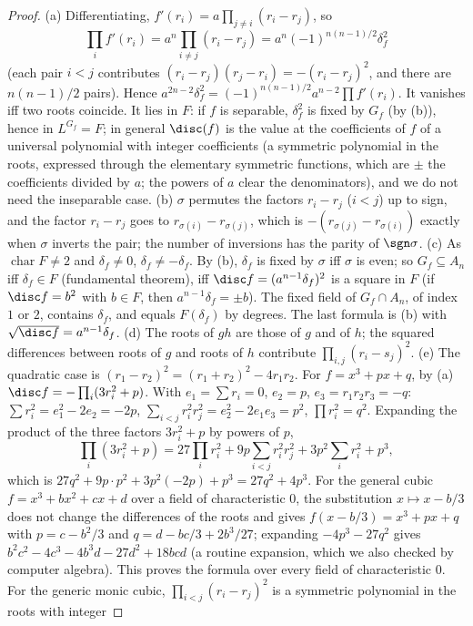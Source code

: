 \begin{proof}
(a) Differentiating, $f'(r_i)=a\prod_{j\ne i}(r_i-r_j)$, so
\[
\prod_if'(r_i)=a^n\prod_{i\ne j}(r_i-r_j)=a^n(-1)^{n(n-1)/2}\delta_f^2
\]
(each pair $i<j$ contributes $(r_i-r_j)(r_j-r_i)=-(r_i-r_j)^2$, and there are $n(n-1)/2$ pairs). Hence $a^{2n-2}\delta_f^2=(-1)^{n(n-1)/2}a^{n-2}\prod f'(r_i)$. It vanishes iff two roots coincide. It lies in $F$: if $f$ is separable, $\delta_f^2$ is fixed by
$G_f$ (by (b)), hence in $L^{G_f}=F$; in general $\disc(f)$ is the value at the coefficients of $f$ of a universal polynomial with integer coefficients (a symmetric
polynomial in the roots, expressed through the elementary symmetric functions, which are $\pm$ the coefficients divided by $a$; the powers of $a$ clear the
denominators), and we do not need the inseparable case.
(b) $\sigma$ permutes the factors $r_i-r_j$ ($i<j$) up to sign, and the factor $r_i-r_j$ goes to $r_{\sigma(i)}-r_{\sigma(j)}$, which is $-(r_{\sigma(j)}-r_{\sigma(i)})$
exactly when $\sigma$ inverts the pair; the number of inversions has the parity of $\sgn\sigma$.
(c) As $\operatorname{char}F\ne2$ and $\delta_f\ne0$, $\delta_f\ne-\delta_f$. By (b), $\delta_f$ is fixed by $\sigma$ iff $\sigma$ is even; so $G_f\subseteq A_n$ iff
$\delta_f\in F$ (fundamental theorem), iff $\disc f=(a^{n-1}\delta_f)^2$ is a square in $F$ (if $\disc f=b^2$ with $b\in F$, then $a^{n-1}\delta_f=\pm b$). The fixed field
of $G_f\cap A_n$, of index $1$ or $2$, contains $\delta_f$, and equals $F(\delta_f)$ by degrees. The last formula is (b) with $\sqrt{\disc f}=a^{n-1}\delta_f$.
(d) The roots of $gh$ are those of $g$ and of $h$; the squared differences between roots of $g$ and roots of $h$ contribute $\prod_{i,j}(r_i-s_j)^2$.
(e) The quadratic case is $(r_1-r_2)^2=(r_1+r_2)^2-4r_1r_2$. For $f=x^3+px+q$, by (a) $\disc f=-\prod_i(3r_i^2+p)$. With $e_1=\sum r_i=0$, $e_2=p$, $e_3=r_1r_2r_3=-q$:
$\sum r_i^2=e_1^2-2e_2=-2p$, $\sum_{i<j}r_i^2r_j^2=e_2^2-2e_1e_3=p^2$, $\prod r_i^2=q^2$. Expanding the product of the three factors $3r_i^2+p$ by powers of $p$,
\[
\prod_i(3r_i^2+p)=27\prod_ir_i^2+9p\sum_{i<j}r_i^2r_j^2+3p^2\sum_ir_i^2+p^3,
\]
which is $27q^2+9p\cdot p^2+3p^2(-2p)+p^3=27q^2+4p^3$. For the general
cubic $f=x^3+bx^2+cx+d$ over a field of characteristic $0$, the substitution $x\mapsto x-b/3$ does not change the differences of the roots and gives $f(x-b/3)=x^3+px+q$ with
$p=c-b^2/3$ and $q=d-bc/3+2b^3/27$; expanding $-4p^3-27q^2$ gives $b^2c^2-4c^3-4b^3d-27d^2+18bcd$ (a routine expansion, which we also checked by computer algebra).
This proves the formula over every field of characteristic $0$. For the generic monic cubic, $\prod_{i<j}(r_i-r_j)^2$ is a symmetric polynomial in the roots with integer

\end{proof}

